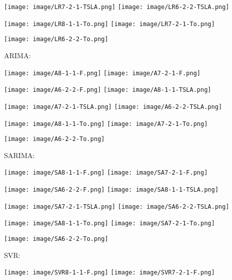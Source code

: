 \documentclass{ieeeojies}
\begin{document}
    \texttt{[image: image/LR7-2-1-TSLA.png]}
    \hspace{0.15cm}\texttt{[image: image/LR6-2-2-TSLA.png]}
    
    \texttt{[image: image/LR8-1-1-To.png]}
    \hspace{0.1cm}\texttt{[image: image/LR7-2-1-To.png]}
    
    \texttt{[image: image/LR6-2-2-To.png]}

ARIMA:

    \texttt{[image: image/A8-1-1-F.png]}
    \texttt{[image: image/A7-2-1-F.png]}
    
    \texttt{[image: image/A6-2-2-F.png]}
    \hspace{0.1cm}\texttt{[image: image/A8-1-1-TSLA.png]}
    
    \texttt{[image: image/A7-2-1-TSLA.png]}
    \hspace{0.07cm}\texttt{[image: image/A6-2-2-TSLA.png]}
    
    \texttt{[image: image/A8-1-1-To.png]}
    \hspace{0.1cm}\texttt{[image: image/A7-2-1-To.png]}
    
    \texttt{[image: image/A6-2-2-To.png]}

SARIMA: 

    \texttt{[image: image/SA8-1-1-F.png]}
    \texttt{[image: image/SA7-2-1-F.png]}
    
    \texttt{[image: image/SA6-2-2-F.png]}
    \hspace{0.1cm}\texttt{[image: image/SA8-1-1-TSLA.png]}
    
    \texttt{[image: image/SA7-2-1-TSLA.png]}
    \hspace{0.15cm}\texttt{[image: image/SA6-2-2-TSLA.png]}
    
    \texttt{[image: image/SA8-1-1-To.png]}
    \hspace{0.1cm}\texttt{[image: image/SA7-2-1-To.png]}
    
    \texttt{[image: image/SA6-2-2-To.png]}

SVR: 

    \texttt{[image: image/SVR8-1-1-F.png]}
    \hspace{0.2cm}\texttt{[image: image/SVR7-2-1-F.png]}
    
\end{document}
